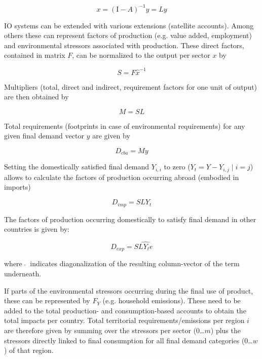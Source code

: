 \documentclass{jors}
\begin{document}
{\begin{equation}
    x = (\mathrm{I}- A)^{-1}y = Ly
\end{equation}


IO systems can be extended with various extensions (satellite accounts).
Among others these can represent factors of production (e.g. value added, employment)
and environmental stressors associated with production.
These direct factors, contained in matrix $F$, can be normalized to the output per sector $x$ by

\begin{equation}
    S = F\hat{x}^{-1}
\end{equation}

Multipliers (total, direct and indirect, requirement factors for one unit of output) are then obtained by

\begin{equation}
    M = SL
\end{equation}



Total requirements (footprints in case of environmental requirements) for any
given final demand vector $y$ are given by 

\begin{equation}
    D_{cba} = My
\end{equation}

Setting the domestically satisfied final demand $Y_{i,i}$ to zero ($Y_{t} = Y -
Y_{i,j}\; |\; i = j$) allows to calculate the factors of production occurring
abroad (embodied in imports)

\begin{equation}
    D_{imp} = SLY_{t}
\end{equation}

The factors of production occurring domestically to satisfy final demand in
other countries is given by: 

\begin{equation}
    D_{exp} = S\widehat{LY_{t}e}
\end{equation}

where $\ \widehat{ }\ $ indicates diagonalization of the resulting column-vector of the term underneath.

If parts of the environmental stressors occurring during the final use of product,
these can be represented by $F_Y$ (e.g. household emissions). 
These need to be added to the total production- and consumption-based accounts to obtain the total impacts per country. 
Total territorial requirements/emissions per region $i$ are therefore given by summing over the stressors per sector (0\ldots$m$) 
plus the stressors directly linked to final consumption for all final demand categories (0\ldots$w$) of that region.

}
\end{document}

